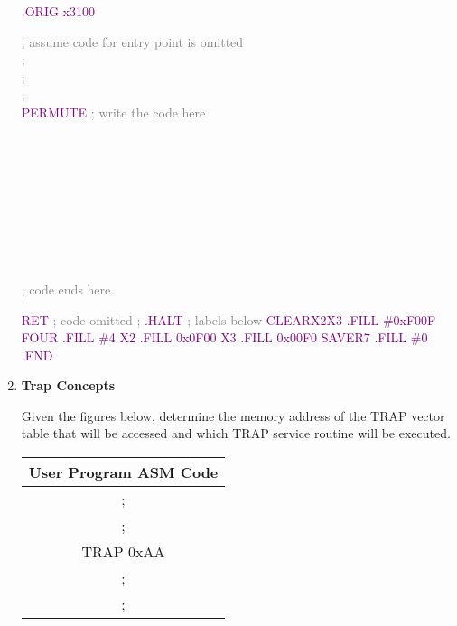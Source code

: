 \documentclass{article}
\begin{document}
\begin{enumerate}[label=(\alph*)]
\textcolor{purple}{.ORIG x3100}

    \textcolor{gray}{; assume code for entry point is omitted}\\
    \textcolor{gray}{;}\\
    \textcolor{gray}{;}\\
    \textcolor{gray}{;}\\

    \textcolor{purple}{PERMUTE} \newline
    \textcolor{gray}{; write the code here}
    \\
    \\
    \\
    \\
    \\
    \\
    \\
    \\
    \\
    \\
    \textcolor{gray}{; code ends here}
    
    \textcolor{purple}{RET}
    \newline \textcolor{gray}{; code omitted}
    \newline    \textcolor{gray}{;}
    \newline \textcolor{purple}{.HALT}
    \textcolor{gray}{; labels below}
    \newline
    \textcolor{purple}{CLEARX2X3 .FILL \#0xF00F}
    \newline
    \textcolor{purple}{FOUR .FILL \#4}
    \newline
    \textcolor{purple}{X2 .FILL 0x0F00}
    \newline
    \textcolor{purple}{X3 .FILL 0x00F0}
    \newline
    \textcolor{purple}{SAVER7 .FILL \#0}
    \newline
    \textcolor{purple}{.END}
    
\item \textbf{Trap Concepts}

Given the figures below, determine the memory address of the TRAP vector table that will be accessed and which TRAP service routine will be executed.
\newline

\begin{center}

\begin{tabular}{||c  ||} 
\hline
\multicolumn{1}{|c|}{User Program ASM Code} \\
 \hline
 ;   \\ 
 \hline
;  \\ 
 \hline
 TRAP 0xAA \\
 \hline
 ;\\
 \hline
 ;  \\
 \hline
 

\end{tabular}
\end{center}
\end{enumerate}
\end{document}
